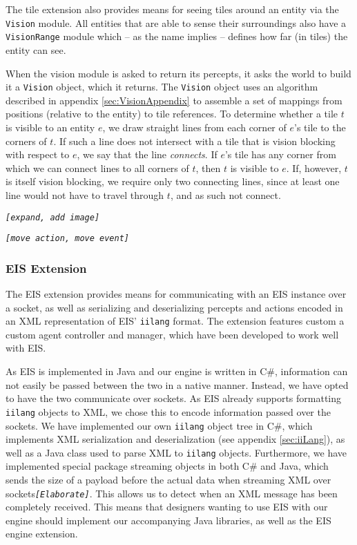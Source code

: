 The tile extension also provides means for seeing tiles around an
entity via the \texttt{Vision} module. All entities that are able
to sense their surroundings also have a \texttt{VisionRange} module
which -- as the name implies -- defines how far (in tiles) the entity
can see.

When the vision module is asked to return its percepts, it asks the
world to build it a \texttt{Vision} object, which it returns. The
\texttt{Vision} object uses an algorithm described in appendix \ref{sec:VisionAppendix}
to assemble a set of mappings from positions (relative to the entity)
to tile references. To determine whether a tile $t$ is visible to
an entity $e$, we draw straight lines from each corner of $e$'s
tile to the corners of $t$. If such a line does not intersect with
a tile that is vision blocking with respect to $e$, we say that the
line \emph{connects}. If $e$'s tile has any corner from which we
can connect lines to all corners of $t$, then $t$ is visible to
$e$. If, however, $t$ is itself vision blocking, we require only
two connecting lines, since at least one line would not have to travel
through $t$, and as such not connect.

\texttt{\emph{{[}expand, add image{]}}}

\texttt{\emph{{[}move action, move event{]}}}


\subsubsection{EIS Extension\label{sub:EIS-Extension}}

The EIS extension provides means for communicating with an EIS instance
over a socket, as well as serializing and deserializing percepts and
actions encoded in an XML representation of EIS' \texttt{iilang} format.
The extension features custom a custom agent controller and manager,
which have been developed to work well with EIS. 

As EIS is implemented in Java and our engine is written in C\#, information
can not easily be passed between the two in a native manner. Instead,
we have opted to have the two communicate over sockets. As EIS already
supports formatting \texttt{iilang} objects to XML, we chose this
to encode information passed over the sockets. We have implemented
our own \texttt{iilang} object tree in C\#, which implements XML serialization
and deserialization (see appendix \ref{sec:iiLang}), as well as a
Java class used to parse XML to \texttt{iilang} objects. Furthermore,
we have implemented special package streaming objects in both C\#
and Java, which sends the size of a payload before the actual data
when streaming XML over sockets\texttt{\emph{{[}Elaborate{]}}}. This
allows us to detect when an XML message has been completely received.
This means that designers wanting to use EIS with our engine should
implement our accompanying Java libraries, as well as the EIS engine
extension.

